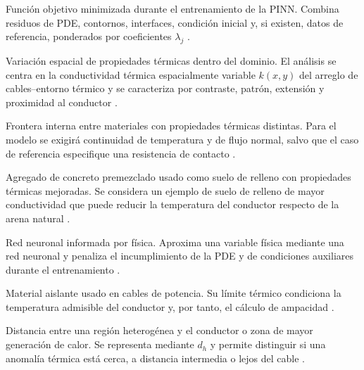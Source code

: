 \documentclass[11pt,a4paper,oneside]{report}
\newcommand{\kx}{k(x,y)}
\begin{document}
\begin{description}[style=nextline,itemsep=0.5\baselineskip,parsep=0pt,topsep=0.25\baselineskip]
  \item[Función de pérdida.] Función objetivo minimizada durante el entrenamiento de la PINN. Combina residuos de PDE, contornos, interfaces, condición inicial y, si existen, datos de referencia, ponderados por coeficientes $\lambda_j$ \parencites[686--690]{raissi2019}[16]{pan2025}[1--2,17]{lawal2022}.

\item[Heterogeneidad térmica.] Variación espacial de propiedades térmicas dentro del dominio. El análisis se centra en la conductividad térmica espacialmente variable $\kx$ del arreglo de cables--entorno térmico y se caracteriza por contraste, patrón, extensión y proximidad al conductor \parencites{farouki1981thermal,devries1966thermal}[4--6]{enescu2021}[1,6--9]{khumalo2025}[1,10,16]{kim2025}.

  \item[Interfaz térmica.] Frontera interna entre materiales con propiedades térmicas distintas. Para el modelo se exigirá continuidad de temperatura y de flujo normal, salvo que el caso de referencia especifique una resistencia de contacto \parencites{carslaw1959conduction,kakac2018heatConduction,hahn2012heatConduction}{patankar1980numerical}[3]{xing2023}[3--4,93--99]{cigre2025}.

  \item[Material PAC.] Agregado de concreto premezclado usado como suelo de relleno con propiedades térmicas mejoradas. Se considera un ejemplo de suelo de relleno de mayor conductividad que puede reducir la temperatura del conductor respecto de la arena natural \parencite[1,10,16]{kim2025}.

  \item[PINN.] Red neuronal informada por física. Aproxima una variable física mediante una red neuronal y penaliza el incumplimiento de la PDE y de condiciones auxiliares durante el entrenamiento \parencites[686--690]{raissi2019}[1--2,14--17]{lawal2022}[1,3,16]{pan2025}.

  \item[Polietileno reticulado o XLPE.] Material aislante usado en cables de potencia. Su límite térmico condiciona la temperatura admisible del conductor y, por tanto, el cálculo de ampacidad \parencites{iec60502_2_2014}[3--5]{enescu2020}[fig.~2]{kim2025}.

  \item[Proximidad de heterogeneidad.] Distancia entre una región heterogénea y el conductor o zona de mayor generación de calor. Se representa mediante $d_h$ y permite distinguir si una anomalía térmica está cerca, a distancia intermedia o lejos del cable \parencites[1,6--9]{khumalo2025}[1,10,16]{kim2025}[1--4]{oclon2015}.


\end{description}
\end{document}
